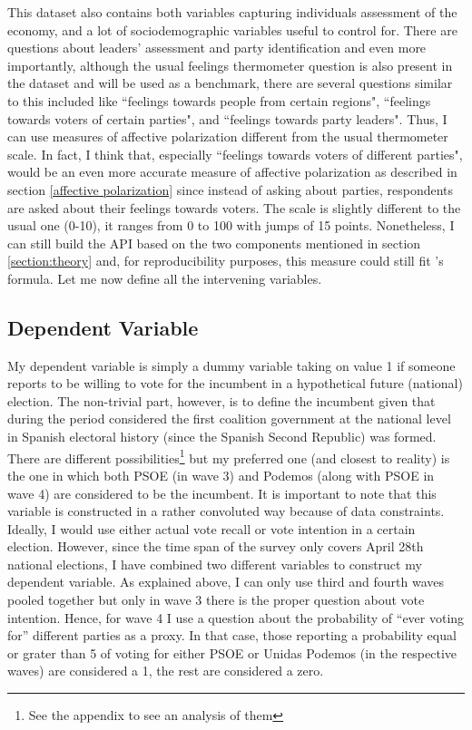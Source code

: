 \documentclass[a4paper, svgnames]{article}
\begin{document}
This dataset also contains both variables capturing individuals assessment of the economy, and a lot of sociodemographic variables useful to control for. There are questions about leaders' assessment and party identification and even more importantly, although the usual feelings thermometer question is also present in the dataset and will be used as a benchmark, there are several questions similar to this included like ``feelings towards people from certain regions", ``feelings towards voters of certain parties", and ``feelings towards party leaders". Thus, I can use measures of affective polarization different from the usual thermometer scale. In fact, I think that, especially ``feelings towards voters of different parties", would be an even more accurate measure of affective polarization as described in section \ref{affective polarization} since instead of asking about parties, respondents are asked about their feelings towards voters. The scale is slightly different to the usual one (0-10), it ranges from 0 to 100 with jumps of 15 points. Nonetheless, I can still build the API based on the two components mentioned in section \ref{section:theory} and, for reproducibility purposes, this measure could still fit \cite{Wagner2021}'s formula. Let me now define all the intervening variables.

\subsection{Dependent Variable}

My dependent variable is simply a dummy variable taking on value 1 if someone reports to be willing to vote for the incumbent in a hypothetical future (national) election. The non-trivial part, however, is to define the incumbent given that during the period considered the first coalition government at the national level in Spanish electoral history (since the Spanish Second Republic) was formed. There are different possibilities\footnote{See the appendix to see an analysis of them} but my preferred one (and closest to reality) is the one in which both PSOE (in wave 3) and Podemos (along with PSOE in wave 4) are considered to be the incumbent. It is important to note that this variable is constructed in a rather convoluted way because of data constraints. Ideally, I would use either actual vote recall or vote intention in a certain election. However, since the time span of the survey only covers April 28th national elections, I have combined two different variables to construct my dependent variable. As explained above, I can only use third and fourth waves pooled together but only in wave 3 there is the proper question about vote intention. Hence, for wave 4 I use a question about the probability of ``ever voting for'' different parties as a proxy. In that case, those reporting a probability equal or grater than 5 of voting for either PSOE or Unidas Podemos (in the respective waves) are considered a 1, the rest are considered a zero.
\end{document}
